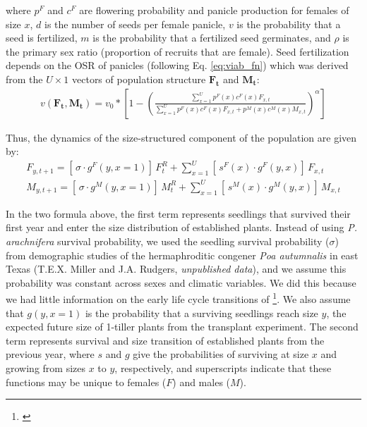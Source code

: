 \documentclass[11pt]{article}
\newcommand{\tom}[2]{{\color{red}{#1}}\footnote{\textit{\color{red}{#2}}}}
\begin{document}
{\noindent where $p^{F}$ and $c^{F}$ are flowering probability and panicle production for females of size $x$, $d$ is the number of seeds per female panicle, $v$ is the probability that a seed is fertilized, $m$ is the probability that a fertilized seed germinates, and $\rho$ is the primary sex ratio (proportion of recruits that are female). 
Seed fertilization depends on the OSR of panicles (following Eq. \ref{eq:viab_fn}) which was derived from the $U \times 1$ vectors of population structure $\mathbf{F_{t}}$ and $\mathbf{M_{t}}$:
\begin{align}\label{eq:viab_MPM}
v(\mathbf{F_{t}},\mathbf{M_{t}}) = v_{0} * \left[ 1 - \left( \frac{\sum_{x=1}^{U} p^{F}(x) c^{F}(x) F_{x,t}}{\sum_{x=1}^{U} p^{F}(x) c^{F}(x) F_{x,t} + p^{M}(x) c^{M}(x) M_{x,t}} \right) ^{\alpha}\right]
\end{align}

Thus, the dynamics of the size-structured component of the population are given by:
\begin{align}\label{eq:dynamics}
F_{y,t+1} = [ \, \sigma \cdot g^{F}(y,x=1) ] \, F^{R}_{t} + \sum_{x=1}^{U} 	[ \, s^{F}(x) \cdot g^{F}(y,x)] \, F_{x,t}
\\
M_{y,t+1} = [ \, \sigma \cdot g^{M}(y,x=1) ] \, M^{R}_{t} + \sum_{x=1}^{U} 	[ \,  s^{M}(x) \cdot g^{M}(y,x) ] \, M_{x,t}
\end{align}

\noindent In the two formula above, the first term represents seedlings that survived their first year and enter the size distribution of established plants.
Instead of using \textit{P. arachnifera} survival probability, we used the seedling survival probability ($\sigma$) from demographic studies of the hermaphroditic congener \textit{Poa autumnalis} in east Texas (T.E.X. Miller and J.A. Rudgers, \textit{unpublished data}), and we assume this probability was constant across sexes and climatic variables. 
We did this because we had little information on the early life cycle transitions of \tom{greenhouse-raised transplants}{You have not described these.}. 
We also assume that $g(y,x=1)$ is the probability that a surviving seedlings reach size $y$, the expected future size of 1-tiller plants from the transplant experiment.
The second term represents survival and size transition of established plants from the previous year, where $s$ and $g$ give the probabilities of surviving at size $x$ and growing from sizes $x$ to $y$, respectively, and superscripts indicate that these functions may be unique to females ($F$) and males ($M$).

}
\end{document}
